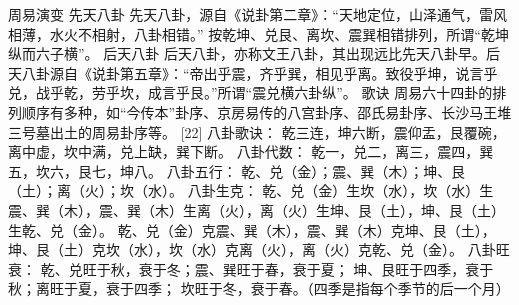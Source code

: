 \documentclass[a4paper,12pt,UTF8,twoside]{ctexbook}
\begin{document}
周易演变
先天八卦
先天八卦，源自《说卦第二章》：“天地定位，山泽通气，雷风相薄，水火不相射，八卦相错。”
按乾坤、兑艮、离坎、震巽相错排列，所谓“乾坤纵而六子横”。
后天八卦
后天八卦，亦称文王八卦，其出现远比先天八卦早。后天八卦源自《说卦第五章》：“帝出乎震，齐乎巽，相见乎离。致役乎坤，说言乎兑，战乎乾，劳乎坎，成言乎艮。”所谓“震兑横六卦纵”。
歌诀
周易六十四卦的排列顺序有多种，如“今传本”卦序、京房易传的八宫卦序、邵氏易卦序、长沙马王堆三号墓出土的周易卦序等。 [22]
八卦歌诀：
乾三连，坤六断，震仰盂，艮覆碗，离中虚，坎中满，兑上缺，巽下断。
八卦代数：
乾一，兑二，离三，震四，巽五，坎六，艮七，坤八。
八卦五行：
乾、兑（金）；震、巽（木）；坤、艮（土）；离（火）；坎（水）。
八卦生克：
乾、兑（金）生坎（水），坎（水）生震、巽（木），震、巽（木）生离（火），离（火）生坤、艮（土），坤、艮（土）生乾、兑（金）。
乾、兑（金）克震、巽（木），震、巽（木）克坤、艮（土），坤、艮（土）克坎（水），坎（水）克离（火），离（火）克乾、兑（金）。
八卦旺衰：
乾、兑旺于秋，衰于冬；震、巽旺于春，衰于夏；
坤、艮旺于四季，衰于秋；离旺于夏，衰于四季；
坎旺于冬，衰于春。（四季是指每个季节的后一个月）
\end{document}
